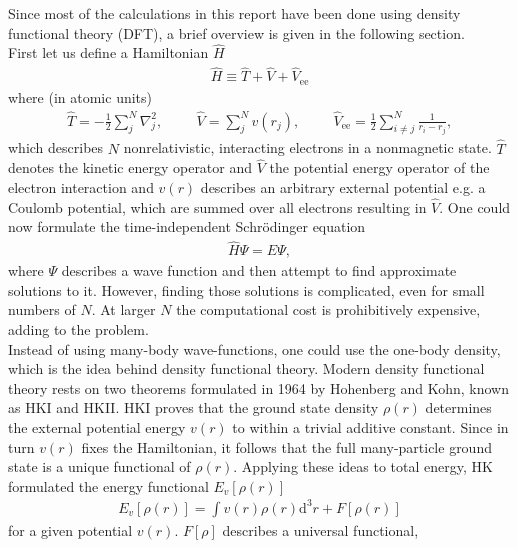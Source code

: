 Since most of the calculations in this report have been done using density functional theory (DFT), a brief overview is given in the following section.\\
First let us define a Hamiltonian $\hat{H}$ 
\begin{align}
    \hat{H} \equiv \hat{T} + \hat{V} + \hat{V}_{\mathrm{ee}}
\end{align}
where (in atomic units)
\begin{align}
    \hat{T} = -\frac{1}{2}\sum^{N}_{j}\nabla_{j}^2, \hspace{1cm} \hat{V} = \sum^{N}_{j}v(r_j), \hspace{1cm} \hat{V}_{\mathrm{ee}} = \frac{1}{2} \sum^{N}_{i\neq j}\frac{1}{r_i - r_j},
\end{align} 
which describes $N$ nonrelativistic, interacting electrons in a nonmagnetic state. $\hat{T}$ denotes the kinetic energy operator and $\hat{V}$ the potential energy operator of the electron interaction and $v(r)$ describes an arbitrary external potential e.g. a Coulomb potential, which are summed over all electrons resulting in $\hat{V}$. \cite{DFT_1} One could now formulate the time-independent Schrödinger equation 
\begin{align}
    \hat{H}\Psi = E\Psi,
\end{align}
where $\Psi$ describes a wave function and then attempt to find approximate solutions to it. However, finding those solutions is complicated, even for small numbers of $N$. At larger $N$ the computational cost is prohibitively expensive, adding to the problem.\\
Instead of using many-body wave-functions, one could use the one-body density, which is the idea behind density functional theory. 
Modern density functional theory rests on two theorems formulated in 1964 by Hohenberg and Kohn, known as HKI and HKII. 
HKI proves that the ground state density $\rho(r)$ determines the external potential energy $v(r)$ to within a trivial additive constant. Since in turn $v(r)$ fixes the Hamiltonian, it follows that the full many-particle ground state is a unique functional of $\rho(r)$.\cite{DFT_2} 
Applying these ideas to total energy, HK formulated the energy functional $E_{v}[\rho(r)]$ 
\begin{align} \label{eq:energy_func}
    E_{v}[\rho(r)] = \int v(r) \rho(r) \mathrm{d}^{3}r + F[\rho(r)] 
\end{align}
for a given potential $v(r)$. $F[\rho]$ describes a universal functional, 
